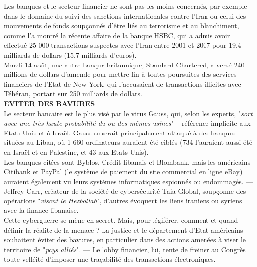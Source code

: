 \documentclass[11pt,twoside,a4paper]{article}
\begin{document}
Les banques et le secteur financier ne sont pas les moins concern{\'e}s, par exemple dans le domaine du suivi des sanctions internationales contre l'Iran ou celui des mouvements de fonds soup\c{c}onn{\'e}s d'{\^e}tre li{\'e}s au terrorisme et au blanchiment, comme l'a montr{\'e} la r{\'e}cente affaire de la banque HSBC, qui a admis avoir effectu{\'e} 25 000 transactions suspectes avec l'Iran entre 2001 et 2007 pour 19,4 milliards de dollars (15,7 milliards d'euros).~\\

Mardi 14 ao{\^u}t, une autre banque britannique, Standard Chartered, a vers{\'e} 240 millions de dollars d'amende pour mettre fin {\`a} toutes poursuites des services financiers de l'Etat de New York, qui l'accusaient de transactions illicites avec T{\'e}h{\'e}ran, portant sur 250 milliards de dollars.~\\

\textbf{EVITER DES BAVURES}~\\

Le secteur bancaire est le plus vis{\'e} par le virus Gauss, qui, selon les experts, "\emph{sort avec une tr{\`e}s haute probabilit{\'e} du ou des m{\^e}mes usines}" -- r{\'e}f{\'e}rence implicite aux Etats-Unis et {\`a} Isra{\"e}l. Gauss se serait principalement attaqu{\'e} {\`a} des banques situ{\'e}es au Liban, o{\`u} 1 660 ordinateurs auraient {\'e}t{\'e} cibl{\'e}s (734 l'auraient aussi {\'e}t{\'e} en Isra{\"e}l et en Palestine, et 43 aux Etats-Unis).~\\

Les banques cit{\'e}es sont Byblos, Cr{\'e}dit libanais et Blombank, mais les am{\'e}ricains Citibank et PayPal (le syst{\`e}me de paiement du site commercial en ligne eBay) auraient {\'e}galement vu leurs syst{\`e}mes informatiques espionn{\'e}s ou endommag{\'e}s. --- Jeffrey Carr, cr{\'e}ateur de la soci{\'e}t{\'e} de cybers{\'e}curit{\'e} Taia Global, soup\c{c}onne des op{\'e}rations "\emph{visant le Hezbollah}", d'autres {\'e}voquent les liens iraniens ou syriens avec la finance libanaise.~\\

Cette cyberguerre se m{\`e}ne en secret. Mais, pour l{\'e}gif{\'e}rer, comment et quand d{\'e}finir la r{\'e}alit{\'e} de la menace ? La justice et le d{\'e}partement d'Etat am{\'e}ricains souhaitent {\'e}viter des bavures, en particulier dans des actions amen{\'e}es {\`a} viser le territoire de "\emph{pays alli{\'e}s}". --- Le lobby financier, lui, tente de freiner au Congr{\`e}s toute vell{\'e}it{\'e} d'imposer une tra\c{c}abilit{\'e} des transactions {\'e}lectroniques.~\\
\end{document}
